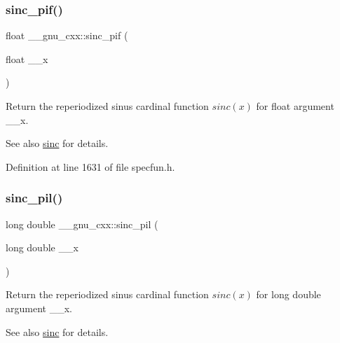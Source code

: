 \subsubsection{\texorpdfstring{sinc\+\_\+pif()}{sinc\_pif()}}
{\footnotesize\ttfamily float \+\_\+\+\_\+gnu\+\_\+cxx\+::sinc\+\_\+pif (\begin{DoxyParamCaption}\item[{float}]{\+\_\+\+\_\+x }\end{DoxyParamCaption})\hspace{0.3cm}{\ttfamily [inline]}}

Return the reperiodized sinus cardinal function $ sinc(x) $ for {\ttfamily float} argument {\ttfamily \+\_\+\+\_\+x}.

\begin{DoxySeeAlso}{See also}
\hyperlink{group__gnu__math__spec__func_ga09976b5d041113979c93613cc3700348}{sinc} for details. 
\end{DoxySeeAlso}


Definition at line 1631 of file specfun.\+h.

\mbox{\label{group__gnu__math__spec__func_gaad38a6e40b1272391a26dbb32a684b3c}} 
\subsubsection{\texorpdfstring{sinc\+\_\+pil()}{sinc\_pil()}}
{\footnotesize\ttfamily long double \+\_\+\+\_\+gnu\+\_\+cxx\+::sinc\+\_\+pil (\begin{DoxyParamCaption}\item[{long double}]{\+\_\+\+\_\+x }\end{DoxyParamCaption})\hspace{0.3cm}{\ttfamily [inline]}}

Return the reperiodized sinus cardinal function $ sinc(x) $ for {\ttfamily long double} argument {\ttfamily \+\_\+\+\_\+x}.

\begin{DoxySeeAlso}{See also}
\hyperlink{group__gnu__math__spec__func_ga09976b5d041113979c93613cc3700348}{sinc} for details. 
\end{DoxySeeAlso}



